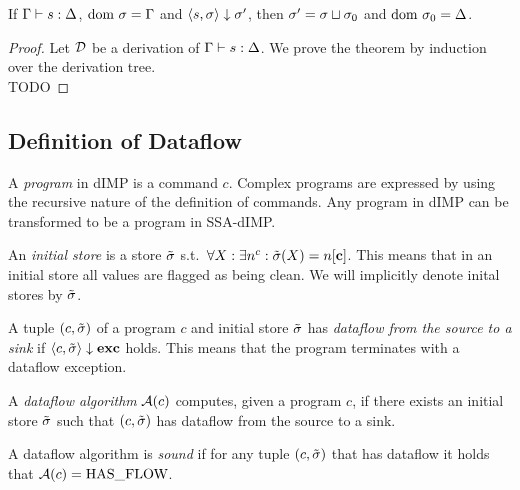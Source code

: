 \begin{theorem}
    If $\Gamma \vdash {s}: \Delta$, $\text{dom } \sigma = \Gamma$ and
    $\langle s, \sigma \rangle \downarrow \sigma'$, then $\sigma' = \sigma \sqcup \sigma_0$
    and $\text{dom }\sigma_0 = \Delta$.
\end{theorem}
\begin{proof}
    Let $\operatorname{\mathcal{D}}$ be a derivation of $\Gamma \vdash {s}: \Delta$.
    We prove the theorem by induction over the derivation tree.\\
    TODO
\end{proof}
\subsection{Definition of Dataflow}
\begin{definition}[Program]
    A \emph{program} in dIMP is a command $c$.
    Complex programs are expressed by using the recursive nature of
    the definition of commands.
    Any program in dIMP can be transformed to be a program in SSA-dIMP.
\end{definition}

\begin{definition}
    An \emph{initial store} is a store $\tilde{\sigma}$ s.t.\ 
    $\forall X: \exists n^c: \initialstore(X) = \clean{}$.
    This means that in an initial store all values are flagged as being clean.
    We will implicitly denote inital stores by $\tilde{\sigma}$.
\end{definition}

\begin{definition}[Dataflow]
    A tuple $(c, \tilde{\sigma})$ of a program $c$ and initial store $\tilde{\sigma}{}$ 
    has \emph{dataflow from the source to a sink} if
    $\langle c, \tilde{\sigma}{} \rangle \downarrow \textbf{exc}$ holds.
    This means that the program terminates with a dataflow exception.
\end{definition}

\begin{definition}
    A \emph{dataflow algorithm} $\operatorname{\mathcal{A}}(c)$ computes, given a program $c$,
    if there exists an initial store $\tilde{\sigma}{}$ 
    such that $(c, \tilde{\sigma})$ has dataflow from the source to a sink.
\end{definition}

\begin{definition}[Soundness]
    A dataflow algorithm is \emph{sound} if for any tuple $(c, \tilde{\sigma})$ that
    has dataflow it holds that $\operatorname{\mathcal{A}}(c) = \text{HAS\_FLOW}$.
\end{definition}


